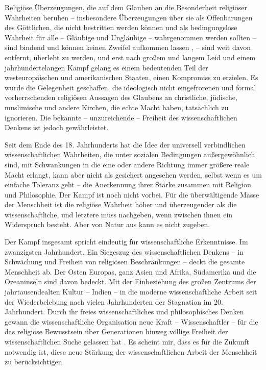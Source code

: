 \documentclass[11pt,a4paper]{book}
\begin{document}
Religiöse Überzeugungen, die auf dem Glauben an die Besonderheit religiöser Wahrheiten beruhen -- insbesondere Überzeugungen über sie als Offenbarungen des Göttlichen, die nicht bestritten werden können und als bedingungslose Wahrheit für alle -- Gläubige und Ungläubige -- wahrgenommen werden sollten -- sind bindend und können keinen Zweifel aufkommen lassen , -- sind weit davon entfernt, überlebt zu werden, und erst nach großem und langem Leid und einem jahrhundertelangen Kampf gelang es einem bedeutenden Teil der westeuropäischen und amerikanischen Staaten, einen Kompromiss zu erzielen. Es wurde die Gelegenheit geschaffen, die ideologisch nicht eingefrorenen und formal vorherrschenden religiösen Aussagen des Glaubens an christliche, jüdische, muslimische und andere Kirchen, die echte Macht haben, tatsächlich zu ignorieren. Die bekannte -- unzureichende -- Freiheit des wissenschaftlichen Denkens ist jedoch gewährleistet.



Seit dem Ende des 18. Jahrhunderts hat die Idee der universell verbindlichen wissenschaftlichen Wahrheiten, die unter sozialen Bedingungen außergewöhnlich sind, mit Schwankungen in die eine oder andere Richtung immer größere reale Macht erlangt, kann aber nicht als gesichert angesehen werden, selbst wenn es um einfache Toleranz geht -- die Anerkennung ihrer Stärke zusammen mit Religion und Philosophie. Der Kampf ist noch nicht vorbei. Für die überwältigende Masse der Menschheit ist die religiöse Wahrheit höher und überzeugender als die wissenschaftliche, und letztere muss nachgeben, wenn zwischen ihnen ein Widerspruch besteht. Aber von Natur aus kann es nicht zugeben.



Der Kampf insgesamt spricht eindeutig für wissenschaftliche Erkenntnisse. Im zwanzigsten Jahrhundert. Ein Siegeszug des wissenschaftlichen Denkens -- in Schwächung und Freiheit von religiösen Beschränkungen -- deckt die gesamte Menschheit ab. Der Osten Europas, ganz Asien und Afrika, Südamerika und die Ozeaninseln sind davon bedeckt. Mit der Einbeziehung des großen Zentrums der jahrtausendealten Kultur -- Indien -- in die moderne wissenschaftliche Arbeit seit der Wiederbelebung nach vielen Jahrhunderten der Stagnation im 20. Jahrhundert. Durch ihr freies wissenschaftliches und philosophisches Denken gewann die wissenschaftliche Organisation neue Kraft -- Wissenschaftler -- für die das religiöse Bewusstsein über Generationen hinweg völlige Freiheit der wissenschaftlichen Suche gelassen hat . Es scheint mir, dass es für die Zukunft notwendig ist, diese neue Stärkung der wissenschaftlichen Arbeit der Menschheit zu berücksichtigen.
\end{document}
